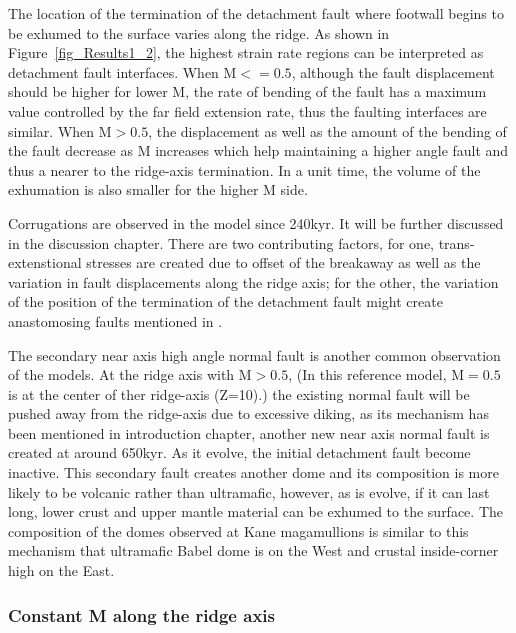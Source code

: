 The location of the termination of the detachment fault where footwall begins to be exhumed to the surface varies along the ridge. As shown in Figure~\ref{fig_Results1_2}, the highest strain rate regions can be interpreted as detachment fault interfaces. When M$<=0.5$, although the fault displacement should be higher for lower M, the rate of bending of the fault has a maximum value controlled by the far field extension rate, thus the faulting interfaces are similar. When M$>0.5$, the displacement as well as the amount of the bending of the fault decrease as M increases which help maintaining a higher angle fault and thus a nearer to the ridge-axis termination. In a unit time, the volume of the exhumation is also smaller for the higher M side.       

Corrugations are observed in the model since 240kyr. It will be further discussed in the discussion chapter. There are two contributing factors, for one, trans-extenstional stresses are created due to offset of the breakaway as well as the variation in fault displacements along the ridge axis; for the other, the variation of the position of the termination of the detachment fault might create anastomosing faults mentioned in \citep{Smith2014}.      

The secondary near axis high angle normal fault is another common observation of the models. At the ridge axis with M$>0.5$, (In this reference model, M$=0.5$ is at the center of ther ridge-axis (Z=10).) the existing normal fault will be pushed away from the ridge-axis due to excessive diking, as its mechanism has been mentioned in introduction chapter, another new near axis normal fault is created at around 650kyr. As it evolve, the initial detachment fault become inactive. This secondary fault creates another dome and its composition is more likely to be volcanic rather than ultramafic, however, as is evolve, if it can last long, lower crust and upper mantle material can be exhumed to the surface. The composition of the domes observed at Kane magamullions is similar to this mechanism that ultramafic Babel dome is on the West and crustal inside-corner high on the East.    

\subsubsection{Constant M along the ridge axis }

